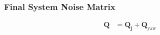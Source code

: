 \documentclass{article}
\begin{document}
\begin{landscape}
\subsubsection{Final System Noise Matrix}

\begin{align}
  \textbf{Q} &= \textbf{Q}_{\textbf{j}} + \textbf{Q}_{\textrm{yaw}}
\end{align}
\end{landscape}
\end{document}
